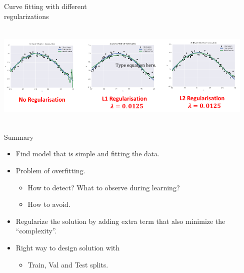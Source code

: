 \documentclass[aspectratio=169,14pt,usenames,dvipsnames]{beamer}
\begin{document}
\begin{frame}[t]{\hspace{3ex} Curve fitting with different \\   regularizations}


\centering
\includegraphics[width=12.5cm, height=5cm]{Images/AIML_OFG_22.png}

\end{frame}


\begin{frame}{Summary}
\begin{itemize}
\item Find model that is simple and fitting the data.
\item Problem of overfitting.
\begin{itemize}
\item How to detect? What to observe during learning?
\item How to avoid.
\end{itemize}
\end{itemize}
\begin{itemize}
\item Regularize the solution by adding extra term that also minimize the “complexity”.
\item Right way to design solution with

\begin{itemize}
\item Train, Val and Test splits.
\end{itemize}
\end{itemize}
\end{frame}
\end{document}
